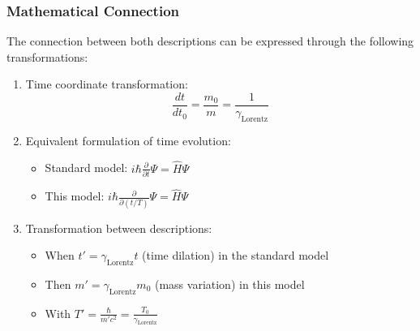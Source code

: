 \documentclass[a4paper,12pt]{article}
\newcommand{\Tzero}{T_0}
\newcommand{\gammaf}{\gamma_{\text{Lorentz}}}
\begin{document}
	\subsubsection{Mathematical Connection}
	The connection between both descriptions can be expressed through the following transformations:
	\begin{enumerate}[leftmargin=*,nosep]
		\item Time coordinate transformation:
		\[
		\frac{dt}{dt_0} = \frac{m_0}{m} = \frac{1}{\gammaf}
		\]
		\item Equivalent formulation of time evolution:
		\begin{itemize}[leftmargin=*,nosep]
			\item Standard model: $i\hbar\frac{\partial}{\partial t}\Psi = \hat{H}\Psi$
			\item This model: $i\hbar\frac{\partial}{\partial (t/T)}\Psi = \hat{H}\Psi$
		\end{itemize}
		\item Transformation between descriptions:
		\begin{itemize}[leftmargin=*,nosep]
			\item When $t' = \gammaf t$ (time dilation) in the standard model
			\item Then $m' = \gammaf m_0$ (mass variation) in this model
			\item With $T' = \frac{\hbar}{m'c^2} = \frac{\Tzero}{\gammaf}$
		\end{itemize}
	\end{enumerate}
	
\end{document}
